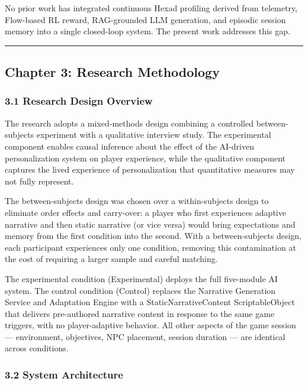 No prior work has integrated continuous Hexad profiling derived from
telemetry, Flow-based RL reward, RAG-grounded LLM generation, and
episodic session memory into a single closed-loop system. The present
work addresses this gap.

\begin{center}\rule{0.5\linewidth}{0.5pt}\end{center}

\subsection{Chapter 3: Research
Methodology}\label{chapter-3-research-methodology}

\subsubsection{3.1 Research Design
Overview}\label{research-design-overview}

The research adopts a mixed-methods design combining a controlled
between-subjects experiment with a qualitative interview study. The
experimental component enables causal inference about the effect of the
AI-driven personalization system on player experience, while the
qualitative component captures the lived experience of personalization
that quantitative measures may not fully represent.

The between-subjects design was chosen over a within-subjects design to
eliminate order effects and carry-over: a player who first experiences
adaptive narrative and then static narrative (or vice versa) would bring
expectations and memory from the first condition into the second. With a
between-subjects design, each participant experiences only one
condition, removing this contamination at the cost of requiring a larger
sample and careful matching.

The experimental condition (Experimental) deploys the full five-module
AI system. The control condition (Control) replaces the Narrative
Generation Service and Adaptation Engine with a StaticNarrativeContent
ScriptableObject that delivers pre-authored narrative content in
response to the same game triggers, with no player-adaptive behavior.
All other aspects of the game session --- environment, objectives, NPC
placement, session duration --- are identical across conditions.

\subsubsection{3.2 System Architecture}\label{system-architecture}

